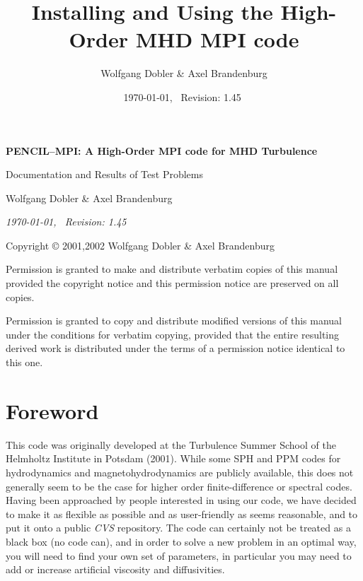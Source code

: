 \documentclass[12pt,twoside,notitlepage,a4paper]{article}
\title{{\sffamily\bfseries Installing and Using the High-Order MHD MPI code}}
\author{Wolfgang Dobler \& Axel Brandenburg}
\date{\today,~ $ $Revision: 1.45 $ $}
\newcommand{\name}[1]{\textsl{#1}\index{#1}\/}
\begin{document}
\pagestyle{empty}


\begin{titlepage}
  \begin{center}

  \large

  \vspace*{3cm}

  {\Large\sffamily\bfseries PENCIL--MPI: A High-Order MPI code for MHD Turbulence}

  \vspace{0.5cm}

  {\sffamily Documentation and Results of Test Problems}

  \vspace{1.5cm}

  {Wolfgang Dobler \& Axel Brandenburg}


  \vspace{2cm}

  \emph{\today,~ $ $Revision: 1.45 $ $}


\end{center}

\end{titlepage}


\newpage
\mbox{}
\vfill

Copyright \copyright{} 2001,2002 Wolfgang Dobler \& Axel Brandenburg
\bigskip

Permission is granted to make and distribute verbatim copies of
this manual provided the copyright notice and this permission notice
are preserved on all copies.

Permission is granted to copy and distribute modified versions
of this manual under the conditions for verbatim copying,
provided that the entire resulting derived work is distributed under the
terms of a permission notice identical to this one.


\clearpage
\pagestyle{plain}

\section*{Foreword}

This code was originally developed at the Turbulence Summer School of the
Helmholtz Institute in Potsdam (2001).
While some SPH and PPM codes for hydrodynamics and magnetohydrodynamics
are publicly available, this does not generally seem to be
the case for higher order finite-difference or spectral codes.
Having been approached by people interested in using our code, we have
decided to make it as flexible as possible and as user-friendly as seems
reasonable, and to put it onto a public \name{CVS} repository.
The code can certainly not be treated as a black box (no code can), and in
order to solve a new problem in an optimal way, you will need to find your
own set of parameters, in particular you may need to add or increase
artificial viscosity and diffusivities.
\end{document}
